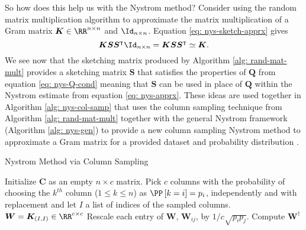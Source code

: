 So how does this help us with the Nystrom method? Consider using the random matrix multiplication algorithm to approximate the matrix multiplication of a Gram matrix $\bm{K} \in \RR^{n \times n}$ and $\Id_{n \times n}$. Equation \ref{eq: nys-sketch-apprx} gives
\begin{equation*}
    \bm{K} \bm{S} \bm{S}^{\intercal} \Id_{n \times n} = \bm{K} \bm{S} \bm{S}^{\intercal} \simeq \bm{K}.
\end{equation*}
We see now that the sketching matrix produced by Algorithm \ref{alg: rand-mat-mult} provides a sketching matrix $\bm{S}$ that satisfies the properties of $\bm{Q}$ from equation \ref{eq: nys-Q-cond} meaning that $\bm{S}$ can be used in place of $\bm{Q}$ within the Nystrom estimate from equation \ref{eq: nys-apprx}. These ideas are used together in Algorithm \ref{alg: nys-col-samp} that uses the column sampling technique from Algorithm \ref{alg: rand-mat-mult} together with the general Nystrom framework (Algorithm \ref{alg: nys-gen}) to provide a new column sampling Nystrom method to approximate a Gram matrix for a provided dataset and probability distribution \cite{JMLR:v6:drineas05a,DBLP:journals/corr/abs-1303-1849}.
{\centering
\begin{minipage}{.85\linewidth}
    \begin{algorithm}[H]
        \caption{Nystrom Method via Column Sampling}
        \label{alg: nys-col-samp}
        \SetAlgoLined
        \DontPrintSemicolon

        \BlankLine
        Initialize $\bm{C}$ as an empty $n \times c$ matrix.\;
        Pick $c$ columns with the probability of choosing the $k^{th}$ column ($1 \leq k \leq n$) as $\PP \left[ k = i \right] = p_i$, independently and with replacement and let $I$ a list of indices of the sampled columns.\;
        $\bm{W} = \bm{K}_{(I,I)} \in \RR^{c \times c}$\;
        Rescale each entry of $\bm{W}$, $\bm{W}_{ij}$, by $1 / c \sqrt{p_i p_j}$.\;
        Compute $\bm{W}^{\dagger}$\;
        \BlankLine
    \end{algorithm}
\end{minipage}
\par}
